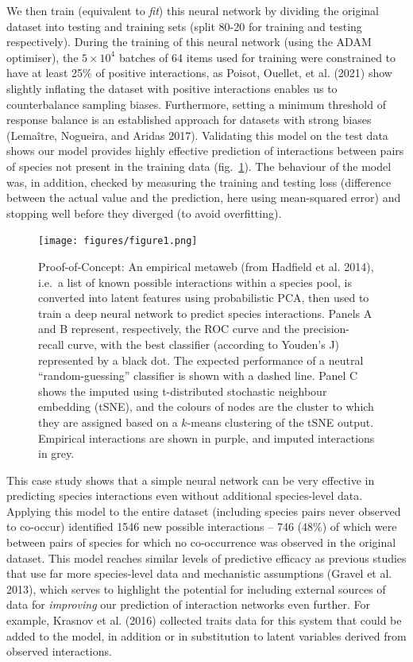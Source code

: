\documentclass[11pt]{article}
\begin{document}
We then train (equivalent to \emph{fit}) this neural network by dividing
the original dataset into testing and training sets (split 80-20 for
training and testing respectively). During the training of this neural
network (using the ADAM optimiser), the \(5\times 10^4\) batches of 64
items used for training were constrained to have at least 25\% of
positive interactions, as Poisot, Ouellet, et al. (2021) show slightly
inflating the dataset with positive interactions enables us to
counterbalance sampling biases. Furthermore, setting a minimum threshold
of response balance is an established approach for datasets with strong
biases (Lemaître, Nogueira, and Aridas 2017). Validating this model on
the test data shows our model provides highly effective prediction of
interactions between pairs of species not present in the training data
(fig.~\ref{fig:example}). The behaviour of the model was, in addition,
checked by measuring the training and testing loss (difference between
the actual value and the prediction, here using mean-squared error) and
stopping well before they diverged (to avoid overfitting).

\begin{figure}
\hypertarget{fig:example}{%
\centering
\texttt{[image: figures/figure1.png]}
\caption{Proof-of-Concept: An empirical metaweb (from Hadfield et al.
2014), i.e.~a list of known possible interactions within a species pool,
is converted into latent features using probabilistic PCA, then used to
train a deep neural network to predict species interactions. Panels A
and B represent, respectively, the ROC curve and the precision-recall
curve, with the best classifier (according to Youden's J) represented by
a black dot. The expected performance of a neutral ``random-guessing''
classifier is shown with a dashed line. Panel C shows the imputed using
t-distributed stochastic neighbour embedding (tSNE), and the colours of
nodes are the cluster to which they are assigned based on a \(k\)-means
clustering of the tSNE output. Empirical interactions are shown in
purple, and imputed interactions in grey.}\label{fig:example}
}
\end{figure}

This case study shows that a simple neural network can be very effective
in predicting species interactions even without additional species-level
data. Applying this model to the entire dataset (including species pairs
never observed to co-occur) identified 1546 new possible interactions --
746 (48\%) of which were between pairs of species for which no
co-occurrence was observed in the original dataset. This model reaches
similar levels of predictive efficacy as previous studies that use far
more species-level data and mechanistic assumptions (Gravel et al.
2013), which serves to highlight the potential for including external
sources of data for \emph{improving} our prediction of interaction
networks even further. For example, Krasnov et al. (2016) collected
traits data for this system that could be added to the model, in
addition or in substitution to latent variables derived from observed
interactions.
\end{document}
